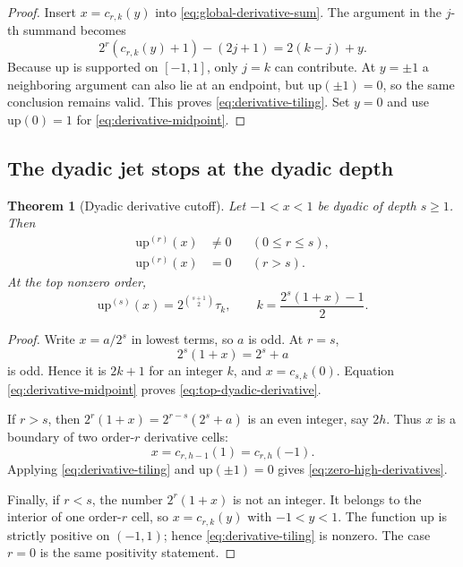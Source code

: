 \documentclass[11pt,oneside]{article}
\numberwithin{equation}{section}
\newtheorem{theorem}{Theorem}[section]
\theoremstyle{definition}
\theoremstyle{remark}
\newcommand{\upf}{\mathrm{up}}
\newcommand{\TM}{\tau}
\begin{document}
\begin{proof}
Insert $x=c_{r,k}(y)$ into \eqref{eq:global-derivative-sum}.  The argument in the
$j$-th summand becomes
\[
 2^r(c_{r,k}(y)+1)-(2j+1)=2(k-j)+y.
\]
Because $\upf$ is supported on $[-1,1]$, only $j=k$ can contribute.  At
$y=\pm1$ a neighboring argument can also lie at an endpoint, but
$\upf(\pm1)=0$, so the same conclusion remains valid.  This proves
\eqref{eq:derivative-tiling}.  Set $y=0$ and use $\upf(0)=1$ for
\eqref{eq:derivative-midpoint}.
\end{proof}

\subsection{The dyadic jet stops at the dyadic depth}

\begin{theorem}[Dyadic derivative cutoff]
Let $-1<x<1$ be dyadic of depth $s\ge1$.  Then
\begin{align}
 \upf^{(r)}(x)&\ne0 &&(0\le r\le s),
 \label{eq:nonzero-low-derivatives}\\
 \upf^{(r)}(x)&=0 &&(r>s).
 \label{eq:zero-high-derivatives}
\end{align}
At the top nonzero order,
\begin{equation}
 \upf^{(s)}(x)=2^{\binom{s+1}{2}}\TM_k,
 \qquad
 k=\frac{2^s(1+x)-1}{2}.
 \label{eq:top-dyadic-derivative}
\end{equation}
\end{theorem}

\begin{proof}
Write $x=a/2^s$ in lowest terms, so $a$ is odd.  At $r=s$,
\[
 2^s(1+x)=2^s+a
\]
is odd.  Hence it is $2k+1$ for an integer $k$, and $x=c_{s,k}(0)$.
Equation \eqref{eq:derivative-midpoint} proves
\eqref{eq:top-dyadic-derivative}.

If $r>s$, then $2^r(1+x)=2^{r-s}(2^s+a)$ is an even integer, say $2h$.
Thus $x$ is a boundary of two order-$r$ derivative cells:
\[
 x=c_{r,h-1}(1)=c_{r,h}(-1).
\]
Applying \eqref{eq:derivative-tiling} and $\upf(\pm1)=0$ gives
\eqref{eq:zero-high-derivatives}.

Finally, if $r<s$, the number $2^r(1+x)$ is not an integer.  It belongs to the
interior of one order-$r$ cell, so $x=c_{r,k}(y)$ with $-1<y<1$.  The function
$\upf$ is strictly positive on $(-1,1)$; hence
\eqref{eq:derivative-tiling} is nonzero.  The case $r=0$ is the same positivity
statement.
\end{proof}
\end{document}
